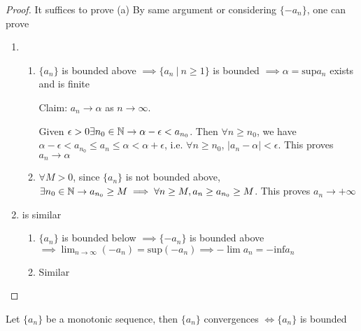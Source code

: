 \begin{proof}

	It suffices to prove (a) By same argument or considering $\{-a_n\}$, one can prove
	
	\begin{enumerate}[label = $(\alph*)$]
		\item \begin{enumerate}[label = $(\roman* )$]
				\item $\{a_n\}$ is bounded above $\implies \{a_n ~|~ n \geq 1\}$ is bounded $\implies \alpha = \text{sup}a_n$ exists and is finite
			
				Claim: $a_n \rightarrow \alpha$ as $n \rightarrow \infty$.
			
				Given $\epsilon > 0 \exists n_0 \in \mathbb{N} \rightarrow \alpha - \epsilon < a_{n_0}$. Then $\forall n \geq n_0$, we have $\alpha - \epsilon < a_{n_0} \leq a_n \leq \alpha < \alpha + \epsilon$, i.e. $\forall n \geq n_0$, $|a_n - \alpha| < \epsilon$. This proves $a_n \rightarrow \alpha$
			\item $\forall M > 0$, since $\{a_n\}$ is not bounded above, $\exists n_0 \in \mathbb{N} \rightarrow a_{n_0} \geq M \implies \forall n \geq M, a_n \geq a_{n_0} \geq M$. This proves $a_n \rightarrow + \infty$
		\end{enumerate}
		
		\item is similar
		
		\begin{enumerate}[wide,label = $(\roman* ')$]
			\item $\{a_n\}$ is bounded below $\implies \{-a_n\}$ is bounded above $\implies \lim_{n \rightarrow \infty}(-a_n) = \text{sup}(-a_n) \implies -\lim a_n = - \text{inf}a_n$
			\item Similar
			
		\end{enumerate}
		
		\end{enumerate}

	
\end{proof}

\begin{rmk*}
	Let $\{a_n\}$ be a monotonic sequence, then $\{a_n\}$ convergences $\Leftrightarrow \{a_n\}$ is bounded	
\end{rmk*}






























